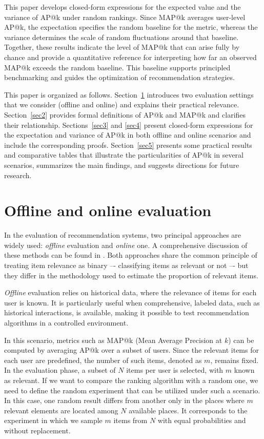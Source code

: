 \documentclass{tpms-l}
\theoremstyle{definition}
\theoremstyle{remark}
\numberwithin{equation}{section}
\begin{document}
This paper develops closed-form expressions for the expected value and the variance of AP@k under random rankings. Since MAP@k averages user-level AP@k, the expectation specifies the random baseline for the metric, whereas the variance determines the scale of random fluctuations around that baseline. Together, these results indicate the level of MAP@k that can arise fully by chance and provide a quantitative reference for interpreting how far an observed MAP@k exceeds the random baseline. This baseline supports principled benchmarking and guides the optimization of recommendation strategies.

This paper is organized as follows. Section~\ref{sec1} introduces two evaluation settings that we consider (offline and online) and explains their practical relevance. Section~\ref{sec2} provides formal definitions of AP@k and MAP@k and clarifies their relationship. Sections~\ref{sec3} and \ref{sec4} present closed-form expressions for the expectation and variance of AP@k in both offline and online scenarios and include the corresponding proofs. Section~\ref{sec5} presents some practical results and comparative tables that illustrate the particularities of AP@k in several scenarios, summarizes the main findings, and suggests directions for future research.
\section{Offline and online evaluation} \label{sec1}
In the evaluation of recommendation systems, two principal approaches are widely used: \textit{offline} evaluation and \textit{online} one. A comprehensive discussion of these methods can be found in \cite{Agarwal_Chen_2016}. Both approaches share the common principle of treating item relevance as binary –- classifying items as relevant or not –- but they differ in the methodology used to estimate the proportion of relevant items.


\textit{Offline} evaluation relies on historical data, where the relevance of items for each user is known. It is particularly useful when comprehensive, labeled data, such as historical interactions, is available, making it possible to test recommendation algorithms in a controlled environment.

In this scenario, metrics such as MAP@k (Mean Average Precision at $k$) can be computed by averaging AP@k over a subset of users. Since the relevant items for each user are predefined, the number of such items, denoted as $m$, remains fixed. In the evaluation phase, a subset of $N$ items per user is selected, with $m$ known as relevant. If we want to compare the ranking algorithm with a random one, we need to define the random experiment that can be utilized under such a scenario. In this case, one random result differs from another only in the places where $m$ relevant elements are located among $N$ available places. It corresponds to the experiment in which we sample $m$ items from $N$ with equal probabilities and without replacement.
\end{document}
